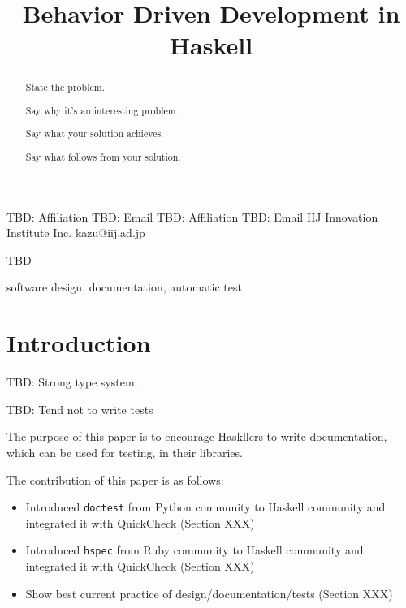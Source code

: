\documentclass[preprint]{sigplanconf}
\begin{document}
\copyrightdata{[to be supplied]}


\title{Behavior Driven Development in Haskell}

           {TBD: Affiliation}
           {TBD: Email}
           {TBD: Affiliation}
           {TBD: Email}
           {IIJ Innovation Institute Inc.}
           {kazu@iij.ad.jp}

\maketitle

\begin{abstract}

State the problem.

Say why it’s an interesting problem.

Say what your solution achieves.

Say what follows from your solution.

\end{abstract}


\terms
TBD

\keywords
software design, documentation, automatic test

\section{Introduction}


TBD: Strong type system.

TBD: Tend not to write tests

The purpose of this paper is to
encourage Haskllers to write documentation, which can be used for testing, in their libraries.


The contribution of this paper is as follows:

\begin{itemize}
\item Introduced {\tt doctest} from Python community to Haskell community
and integrated it with QuickCheck (Section XXX)
\item Introduced {\tt hspec} from Ruby community to Haskell community and
integrated it with QuickCheck (Section XXX)
\item Show best current practice of design/documentation/tests (Section XXX)
\end{itemize}
\end{document}
